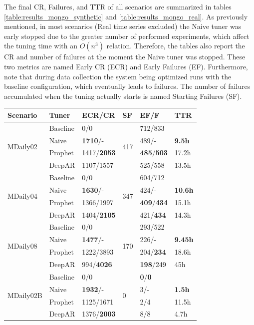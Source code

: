 \documentclass[a4paper, 12pt]{article} %
\newcommand{\ra}[1]{\renewcommand{\arraystretch}{#1}}
\begin{document}
	The final CR, Failures, and TTR of all scenarios are summarized in tables \ref{table:results_mongo_synthetic} and \ref{table:results_mongo_real}. As previously mentioned, in most scenarios (Real time series excluded) the Naive tuner was early stopped due to the greater number of performed experiments, which affect the tuning time with an $O(n^3)$ relation. Therefore, the tables also report the CR and number of failures at the moment the Naive tuner was stopped. These two metrics are named Early CR (ECR) and Early Failures (EF). Furthermore, note that during data collection the system being optimized runs with the baseline configuration, which eventually leads to failures. The number of failures accumulated when the tuning actually starts is named Starting Failures (SF).
	
	\begin{table}\centering 
		\ra{1.3}
		\begin{tabularx}{\textwidth}{@{}XXXXXX@{}}
			\toprule
			Scenario & Tuner & ECR/CR & SF & EF/F & TTR\\
			
			\midrule
			\multirow{4}{*}{MDaily02}
			& Baseline & 0/0 & \multirow{4}{*}{417} & 712/833 & \\
			& Naive & \textbf{1710}/-  && 489/- & \textbf{9.5h} \\
			& Prophet & 1417/\textbf{2053} && \textbf{485}/\textbf{503} & 17.2h\\
			& DeepAR & 1107/1557 && 525/558 & 13.5h\\
			
			
			\midrule
			\multirow{4}{*}{MDaily04}
			& Baseline & 0/0 & \multirow{4}{*}{347}  & 604/712 & \\
			& Naive & \textbf{1630}/- && 424/- & \textbf{10.6h} \\
			& Prophet & 1366/1997 && \textbf{409}/\textbf{434} & 15.1h \\
			& DeepAR & 1404/\textbf{2105} && 421/\textbf{434} & 14.3h \\
			
			\midrule
			\multirow{4}{*}{MDaily08}
			& Baseline & 0/0 & \multirow{4}{*}{170} & 293/522 & \\
			& Naive & \textbf{1477}/- && 226/- & \textbf{9.45h}\\
			& Prophet & 1222/3893 && 204/\textbf{234} & 18.6h\\
			& DeepAR & 994/\textbf{4026} && \textbf{198}/249 & 45h\\
			
			\midrule
			\multirow{4}{*}{MDaily02B}
			& Baseline & 0/0 & \multirow{4}{*}{0} & \textbf{0}/\textbf{0} & \\
			& Naive & \textbf{1932}/- && 3/- & \textbf{1.5h}  \\
			& Prophet & 1125/1671 && 2/4 & 11.5h \\
			& DeepAR & 1376/\textbf{2003} && 8/8 & 4.7h\\
			

\end{tabularx}
\end{table}
\end{document}
